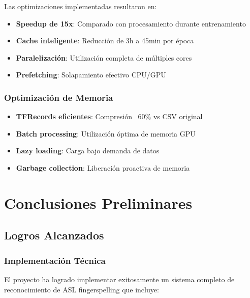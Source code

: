 \documentclass[12pt,a4paper]{article}
\begin{document}
Las optimizaciones implementadas resultaron en:

\begin{itemize}
    \item \textbf{Speedup de 15x}: Comparado con procesamiento durante entrenamiento
    \item \textbf{Cache inteligente}: Reducción de 3h a 45min por época
    \item \textbf{Paralelización}: Utilización completa de múltiples cores
    \item \textbf{Prefetching}: Solapamiento efectivo CPU/GPU
\end{itemize}

\subsubsection{Optimización de Memoria}

\begin{itemize}
    \item \textbf{TFRecords eficientes}: Compresión ~60\% vs CSV original
    \item \textbf{Batch processing}: Utilización óptima de memoria GPU
    \item \textbf{Lazy loading}: Carga bajo demanda de datos
    \item \textbf{Garbage collection}: Liberación proactiva de memoria
\end{itemize}

\section{Conclusiones Preliminares}

\subsection{Logros Alcanzados}

\subsubsection{Implementación Técnica}

El proyecto ha logrado implementar exitosamente un sistema completo de reconocimiento de ASL fingerspelling que incluye:
\end{document}
